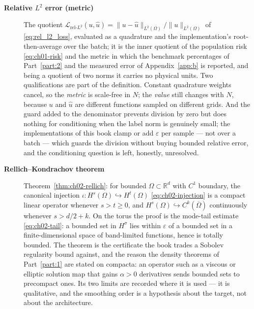\begin{description}
\item[\textbf{Relative $L^{2}$ error (metric)}] The quotient
$\mathcal{L}_{\text{rel-}L^{2}}(u, \hat{u}) = \|u - \hat{u}\|_{L^{2}(\Omega)} /
\|u\|_{L^{2}(\Omega)}$ of \eqref{eq:rel_l2_loss}, evaluated as a quadrature and the
implementation's root-then-average over the batch; it is the inner quotient of the
population risk \eqref{eq:ch01-risk} and the metric in which the benchmark percentages of
Part~\ref{part:2} and the measured error of Appendix~\ref{app:b} is reported, and being a
quotient of two norms it carries no physical units. Two qualifications are part of the
definition. Constant quadrature weights cancel, so the \emph{metric} is scale-free in $N$;
the \emph{value} still changes with $N$, because
$u$ and $\hat{u}$ are different functions sampled on different grids. And the guard added
to the denominator prevents division by zero but does nothing for conditioning when the
label norm is genuinely small; the implementations of this book clamp or add $\varepsilon$
per sample --- not over a batch --- which guards the division without buying bounded
relative error, and the conditioning question is left, honestly, unresolved. 

\item[\textbf{Rellich--Kondrachov theorem}] Theorem~\ref{thm:ch02-rellich}: for bounded
$\Omega \subset \mathbb{R}^{d}$ with $C^{1}$ boundary, the canonical injection
$\iota : H^{s}(\Omega) \hookrightarrow H^{t}(\Omega)$ \eqref{eq:ch02-injection} is a compact
linear operator whenever $s > t \ge 0$, and $H^{s}(\Omega) \hookrightarrow C^{k}(\overline{\Omega})$
continuously whenever $s > d/2 + k$. On the torus the proof is the mode-tail estimate
\eqref{eq:ch02-tail}: a bounded set in $H^{\sigma}$ lies within $\varepsilon$ of a bounded
set in a finite-dimensional space of band-limited functions, hence is totally bounded. The
theorem is the certificate the book trades a Sobolev regularity bound against, and the
reason the density theorems of Part~\ref{part:1} are stated on compacta: an operator such
as a viscous or elliptic solution map that gains $\alpha > 0$ derivatives sends bounded
sets to precompact ones. Its two limits are recorded where it is used --- it is qualitative, and
the smoothing order is a hypothesis about the target, not about the architecture.


\end{description}
